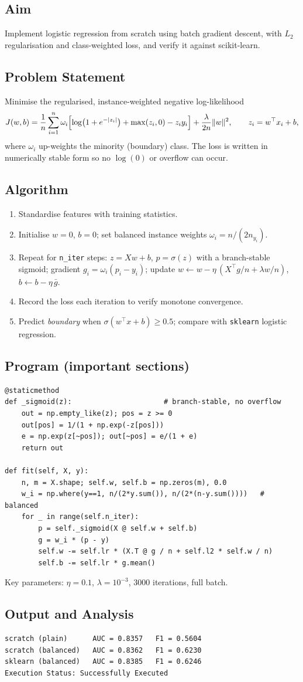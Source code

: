 \documentclass[11pt,a4paper]{article}
\newcommand{\labsection}[1]{\subsection*{#1}}
\begin{document}
\labsection{Aim}
Implement logistic regression from scratch using batch gradient descent, with $L_2$ regularisation and class-weighted loss, and verify it against scikit-learn.

\labsection{Problem Statement}
Minimise the regularised, instance-weighted negative log-likelihood
\[
J(w,b)=\frac{1}{n}\sum_{i=1}^{n} \omega_i\Bigl[\log\bigl(1+e^{-|z_i|}\bigr)+\max(z_i,0)-z_i y_i\Bigr]+\frac{\lambda}{2n}\lVert w\rVert^2,
\qquad z_i=w^\top x_i+b,
\]
where $\omega_i$ up-weights the minority (boundary) class. The loss is written in numerically stable form so no $\log(0)$ or overflow can occur.

\labsection{Algorithm}
\begin{enumerate}[nosep]
  \item Standardise features with training statistics.
  \item Initialise $w=0$, $b=0$; set balanced instance weights $\omega_i = n/(2 n_{y_i})$.
  \item Repeat for \texttt{n\_iter} steps: $z=Xw+b$, $p=\sigma(z)$ with a branch-stable sigmoid; gradient $g_i=\omega_i(p_i-y_i)$; update $w\leftarrow w-\eta\,(X^\top g/n+\lambda w/n)$, $b\leftarrow b-\eta\,\bar g$.
  \item Record the loss each iteration to verify monotone convergence.
  \item Predict \emph{boundary} when $\sigma(w^\top x+b)\ge 0.5$; compare with \texttt{sklearn} logistic regression.
\end{enumerate}

\labsection{Program (important sections)}
\begin{lstlisting}
@staticmethod
def _sigmoid(z):                      # branch-stable, no overflow
    out = np.empty_like(z); pos = z >= 0
    out[pos] = 1/(1 + np.exp(-z[pos]))
    e = np.exp(z[~pos]); out[~pos] = e/(1 + e)
    return out

def fit(self, X, y):
    n, m = X.shape; self.w, self.b = np.zeros(m), 0.0
    w_i = np.where(y==1, n/(2*y.sum()), n/(2*(n-y.sum())))   # balanced
    for _ in range(self.n_iter):
        p = self._sigmoid(X @ self.w + self.b)
        g = w_i * (p - y)
        self.w -= self.lr * (X.T @ g / n + self.l2 * self.w / n)
        self.b -= self.lr * g.mean()
\end{lstlisting}
Key parameters: $\eta = 0.1$, $\lambda = 10^{-3}$, $3000$ iterations, full batch.

\labsection{Output and Analysis}
\begin{lstlisting}[style=output]
scratch (plain)      AUC = 0.8357   F1 = 0.5604
scratch (balanced)   AUC = 0.8362   F1 = 0.6230
sklearn (balanced)   AUC = 0.8385   F1 = 0.6246
Execution Status: Successfully Executed
\end{lstlisting}
\end{document}
